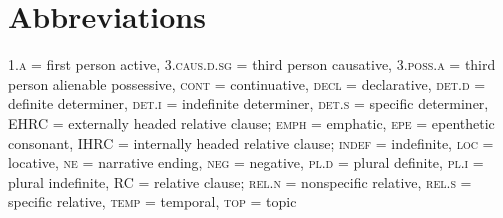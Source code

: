 \documentclass[output=paper]{LSP/langsci}
\begin{document}
\section*{Abbreviations}

\textsc{1.a} = first person active, \textsc{3.caus.d.sg} = third person causative, \textsc{3.poss.a} = third person alienable possessive, \textsc{cont} = continuative, \textsc{decl} = declarative, \textsc{det.d} = definite determiner, \textsc{det.i} = indefinite determiner, \textsc{det.s} = specific determiner, EHRC = externally headed relative clause; \textsc{emph} = emphatic, \textsc{epe} = epenthetic consonant, IHRC = internally headed relative clause; \textsc{indef} = indefinite, \textsc{loc} = locative, \textsc{ne} = narrative ending, \textsc{neg} = negative, \textsc{pl.d} = plural definite, \textsc{pl.i} = plural indefinite, RC = relative clause; \textsc{rel.n} = nonspecific relative, \textsc{rel.s} = specific relative, \textsc{temp} = temporal, \textsc{top} = topic

\printbibliography[heading=subbibliography,notkeyword=this]
\end{document}
